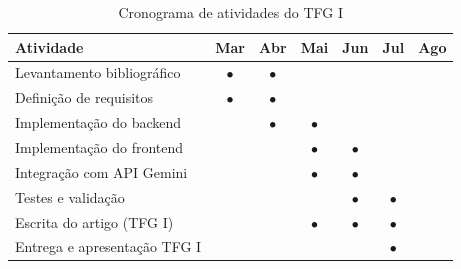 \documentclass[conference]{IEEEtran}
\begin{document}
\begin{table}[H]
  \centering
  \caption{Cronograma de atividades do TFG I}
  \label{tab:cronograma_tfg1}
  \begin{tabular}{lcccccc}
    \toprule
    \textbf{Atividade} & \textbf{Mar} & \textbf{Abr} & \textbf{Mai} & \textbf{Jun} & \textbf{Jul} & \textbf{Ago} \\
    \midrule
    Levantamento bibliográfico   & $\bullet$ & $\bullet$ &           &           &           &           \\
    Definição de requisitos      & $\bullet$ & $\bullet$ &           &           &           &           \\
    Implementação do backend     &           & $\bullet$ & $\bullet$ &           &           &           \\
    Implementação do frontend    &           &           & $\bullet$ & $\bullet$ &           &           \\
    Integração com API Gemini    &           &           & $\bullet$ & $\bullet$ &           &           \\
    Testes e validação           &           &           &           & $\bullet$ & $\bullet$ &           \\
    Escrita do artigo (TFG I)    &           &           & $\bullet$ & $\bullet$ & $\bullet$ &           \\
    Entrega e apresentação TFG I &           &           &           &           & $\bullet$ &           \\
    \bottomrule
  \end{tabular}
\end{table}
\end{document}
